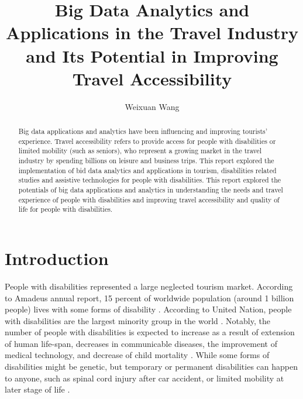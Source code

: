 \title{Big Data Analytics and Applications in the Travel Industry and Its Potential in Improving Travel Accessibility}

\author{Weixuan Wang}
 

\renewcommand{\shortauthors}{Weixuan Wang}


\begin{abstract}
Big data applications and analytics have been influencing and improving 
tourists' experience. Travel accessibility refers to provide access for 
people with disabilities or limited mobility (such as seniors), who represent
a growing market in the travel industry by spending billions on leisure and 
business trips. This report explored the implementation of bid data analytics
and applications in tourism, disabilities related studies and assistive technologies
for people with disabilities. This report explored the potentials of big data applications
and analytics in understanding the needs and travel experience of people with disabilities
and improving travel accessibility and quality of life for people with disabilities.
\end{abstract}



\maketitle



\section{Introduction}
People with disabilities represented a large neglected tourism market. According to
Amadeus annual report, 15 percent of worldwide population (around 1 billion people) lives
with some forms of disability \cite{Ama}. According to United Nation, people with 
disabilities are the largest minority group in the world
\cite{Appleyard2005,DARCY2010816,Lex}. Notably, the number of people with disabilities is
expected to increase as a  result of extension of human life-span, decreases in
communicable diseases, the improvement of medical technology, and decrease of child
mortality \cite{SMITH1987376}.  While some forms of disabilities might be genetic, but
temporary or permanent disabilities can happen to anyone, such 
as spinal cord injury after car accident, or limited mobility at later stage of life
\cite{Lex}. 

